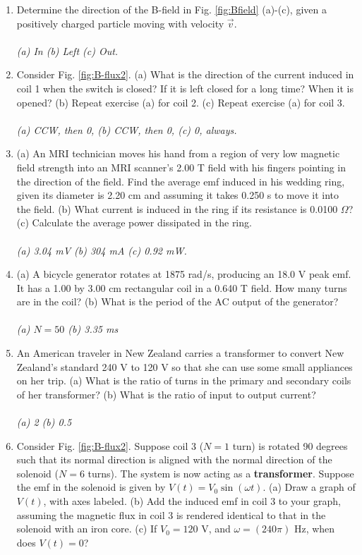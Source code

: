 \documentclass[12pt,twocolumn]{article}
\begin{document}
\begin{enumerate}
\item Determine the direction of the B-field in Fig. \ref{fig:Bfield} (a)-(c), given a positively charged particle moving with velocity $\vec{v}$. \\ \\
\textit{(a) In (b) Left (c) Out.}
\item Consider Fig. \ref{fig:B-flux2}.  (a) What is the direction of the current induced in coil 1 when the switch is closed?  If it is left closed for a long time?  When it is opened?  (b) Repeat exercise (a) for coil 2.  (c) Repeat exercise (a) for coil 3. \\ \\
\textit{(a) CCW, then 0, (b) CCW, then 0, (c) 0, always.}
\item (a) An MRI technician moves his hand from a region of very low magnetic field strength into an MRI scanner's 2.00 T field with his fingers pointing in the direction of the field. Find the average emf induced in his wedding ring, given its diameter is 2.20 cm and assuming it takes 0.250 s to move it into the field. (b) What current is induced in the ring if its resistance is 0.0100 $\Omega$?  (c) Calculate the average power dissipated in the ring. \\ \\
\textit{(a) 3.04 mV (b) 304 mA (c) 0.92 mW.}
\item (a) A bicycle generator rotates at 1875 rad/s, producing an 18.0 V peak emf. It has a 1.00 by 3.00 cm rectangular coil in a 0.640 T field. How many turns are in the coil? (b) What is the period of the AC output of the generator?  \\ \\
\textit{(a) $N = 50$ (b) 3.35 ms}
\item An American traveler in New Zealand carries a transformer to convert New Zealand's standard 240 V to 120 V so that she can use some small appliances on her trip. (a) What is the ratio of turns in the primary and secondary coils of her transformer? (b) What is the ratio of input to output current? \\ \\
\textit{(a) 2 (b) 0.5}
\item Consider Fig. \ref{fig:B-flux2}.  Suppose coil 3 ($N=1$ turn) is rotated 90 degrees such that its normal direction is aligned with the normal direction of the solenoid ($N=6$ turns).  The system is now acting as a \textbf{transformer}.  Suppose the emf in the solenoid is given by $V(t) = V_0 \sin(\omega t)$. (a) Draw a graph of $V(t)$, with axes labeled.  (b) Add the induced emf in coil 3 to your graph, assuming the magnetic flux in coil 3 is rendered identical to that in the solenoid with an iron core.  (c) If $V_0 = 120$ V, and $\omega = (240\pi)$ Hz, when does $V(t) = 0$? \\ \\

\end{enumerate}
\end{document}
